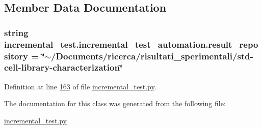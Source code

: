 \subsection{Member Data Documentation}
\hypertarget{classincremental__test_1_1incremental__test__automation_afbbdcc0177de0d7d04bbf38ea90e9a5a}{}
\subsubsection[{result\+\_\+repository}]{\setlength{\rightskip}{0pt plus 5cm}string incremental\+\_\+test.\+incremental\+\_\+test\+\_\+automation.\+result\+\_\+repository = \char`\"{}$\sim$/Documents/ricerca/risultati\+\_\+sperimentali/std-\/cell-\/library-\/characterization\char`\"{}\hspace{0.3cm}{\ttfamily [static]}}\label{classincremental__test_1_1incremental__test__automation_afbbdcc0177de0d7d04bbf38ea90e9a5a}


Definition at line \hyperlink{incremental__test_8py_source_l00163}{163} of file \hyperlink{incremental__test_8py_source}{incremental\+\_\+test.\+py}.



The documentation for this class was generated from the following file\+:\begin{DoxyCompactItemize}
\item 
\hyperlink{incremental__test_8py}{incremental\+\_\+test.\+py}\end{DoxyCompactItemize}
